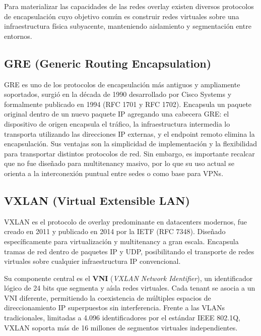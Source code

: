 
Para materializar las capacidades de las redes overlay existen diversos protocolos de encapsulación cuyo objetivo común es construir redes virtuales sobre una infraestructura física subyacente, manteniendo aislamiento y segmentación entre entornos.

\subsection{GRE (Generic Routing Encapsulation)}

GRE es uno de los protocolos de encapsulación más antiguos y ampliamente soportados, surgió en la década de 1990 desarrollado por Cisco Systems y formalmente publicado en 1994 (RFC 1701 y RFC 1702). Encapsula un paquete original dentro de un nuevo paquete IP agregando una cabecera GRE: el dispositivo de origen encapsula el tráfico, la infraestructura intermedia lo transporta utilizando las direcciones IP externas, y el endpoint remoto elimina la encapsulación. Sus ventajas son la simplicidad de implementación y la flexibilidad para transportar distintos protocolos de red. Sin embargo, es importante recalcar que no fue diseñado para multitenancy masivo, por lo que su uso actual se orienta a la interconexión puntual entre sedes o como base para VPNs.


\subsection{VXLAN (Virtual Extensible LAN)}

VXLAN es el protocolo de overlay predominante en datacenters modernos, fue creado en 2011 y publicado en 2014 por la IETF (RFC 7348). Diseñado específicamente para virtualización y multitenancy a gran escala. Encapsula tramas de red dentro de paquetes IP y UDP, posibilitando el transporte de redes virtuales sobre cualquier infraestructura IP convencional.

Su componente central es el \textbf{VNI} (\textit{VXLAN Network Identifier}), un identificador lógico de 24 bits que segmenta y aísla redes virtuales. Cada tenant se asocia a un VNI diferente, permitiendo la coexistencia de múltiples espacios de direccionamiento IP superpuestos sin interferencia. Frente a las VLANs tradicionales, limitadas a 4.096 identificadores por el estándar IEEE 802.1Q, VXLAN soporta más de 16 millones de segmentos virtuales independientes.

